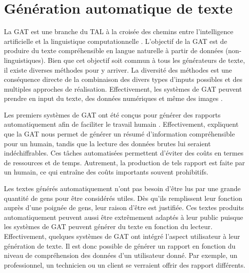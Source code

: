 
\chapter{Génération automatique de texte}


La \acf{GAT} est une branche du \acf{TAL} à la croisée des chemins entre l'intelligence artificielle et la linguistique computationnelle \citep{ReiterBuildingNaturalLanguage2000}. L'objectif de la \ac{GAT} est de produire du texte compréhensible en langue naturelle à partir de données (non-linguistiques). Bien que cet objectif soit commun à tous les générateurs de texte, il existe diverses méthodes pour y arriver. La diversité des méthodes est une conséquence directe de la combinaison des divers types d'inputs possibles et des multiples approches de réalisation. Effectivement, les systèmes de \ac{GAT} peuvent prendre en input du texte, des données numériques et même des images \citep{thomason:coling14}. 

Les premiers systèmes de \ac{GAT} ont été conçus pour générer des rapports automatiquement afin de faciliter le travail humain \citep{ReiterBuildingNaturalLanguage2000}. Effectivement, \cite{DaoustJSREALTextRealizer2015} expliquent que la \ac{GAT} nous permet de générer un résumé d'information compréhensible pour un humain, tandis que la lecture des données brutes lui seraient indéchiffrables. Ces tâches automatisées permettent d'éviter des coûts en termes de ressources et de temps. Autrement, la production de tels rapport est faite par un humain, ce qui entraîne des coûts importants souvent prohibitifs.

Les textes générés automatiquement n'ont pas besoin d'être lus par une grande quantité de gens pour être considérés utiles. Dès qu'ils remplissent leur fonction auprès d'une poignée de gens, leur raison d'être est justifiée. Ces textes produits automatiquement peuvent aussi être extrêmement adaptés à leur public puisque les systèmes de \ac{GAT} peuvent générer du texte en fonction du lecteur. Effectivement, quelques systèmes de \ac{GAT} ont intégré l'aspect utilisateur à leur génération de texte. Il est donc possible de générer un rapport en fonction du niveau de compréhension des données d'un utilisateur donné. Par exemple, un professionnel, un technicien ou un client \citep{1948c0b7a8ca42679cad977bb2cdddc2} se verraient offrir des rapport différents.

